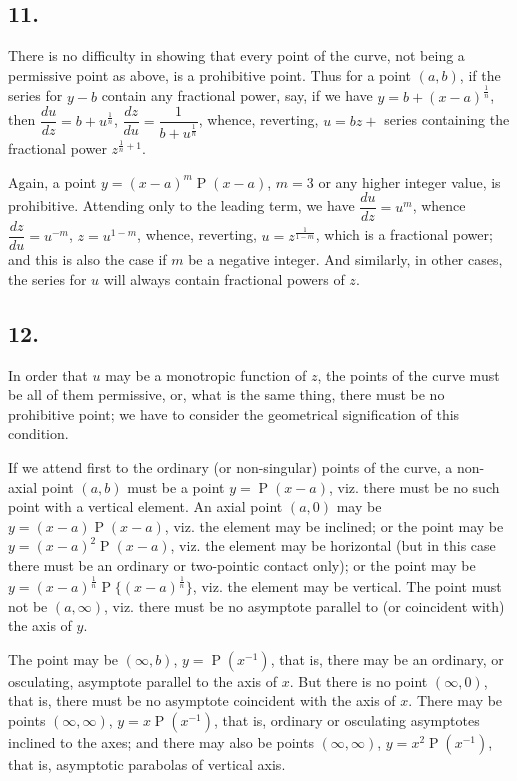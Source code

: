 \documentclass[11pt,a4paper]{article}
\theoremstyle{definition}
\DeclareMathOperator{\Pf}{P}
\begin{document}
\subsection*{11.}

There is no difficulty in showing that every point of the curve, not being a permissive point as above, is a prohibitive point. Thus for a point $(a, b)$, if the series for $y - b$ contain any fractional power, say, if we have $y = b + (x - a)^{\frac{1}{n}}$, then $\dfrac{du}{dz} = b + u^{\frac{1}{n}}$, $\dfrac{dz}{du} = \dfrac{1}{b + u^{\frac{1}{n}}}$, whence, reverting, $u = bz +$ series containing the fractional power $z^{\frac{1}{n} + 1}$.

Again, a point $y = (x - a)^m \Pf(x - a)$, $m = 3$ or any higher integer value, is prohibitive. Attending only to the leading term, we have $\dfrac{du}{dz} = u^m$, whence $\dfrac{dz}{du} = u^{-m}$, $z = u^{1-m}$, whence, reverting, $u = z^{\frac{1}{1-m}}$, which is a fractional power; and this is also the case if $m$ be a negative integer. And similarly, in other cases, the series for $u$ will always contain fractional powers of $z$.

\subsection*{12.}

In order that $u$ may be a monotropic function of $z$, the points of the curve must be all of them permissive, or, what is the same thing, there must be no prohibitive point; we have to consider the geometrical signification of this condition.

If we attend first to the ordinary (or non-singular) points of the curve, a non-axial point $(a, b)$ must be a point $y = \Pf(x - a)$, viz. there must be no such point with a vertical element. An axial point $(a, 0)$ may be $y = (x - a)\Pf(x - a)$, viz. the element may be inclined; or the point may be $y = (x - a)^2 \Pf(x - a)$, viz. the element may be horizontal (but in this case there must be an ordinary or two-pointic contact only); or the point may be $y = (x - a)^{\frac{1}{n}} \Pf\{(x - a)^{\frac{1}{n}}\}$, viz. the element may be vertical. The point must not be $(a, \infty)$, viz. there must be no asymptote parallel to (or coincident with) the axis of $y$.

The point may be $(\infty, b)$, $y = \Pf(x^{-1})$, that is, there may be an ordinary, or osculating, asymptote parallel to the axis of $x$. But there is no point $(\infty, 0)$, that is, there must be no asymptote coincident with the axis of $x$. There may be points $(\infty, \infty)$, $y = x\Pf(x^{-1})$, that is, ordinary or osculating asymptotes inclined to the axes; and there may also be points $(\infty, \infty)$, $y = x^2\Pf(x^{-1})$, that is, asymptotic parabolas of vertical axis.
\end{document}
